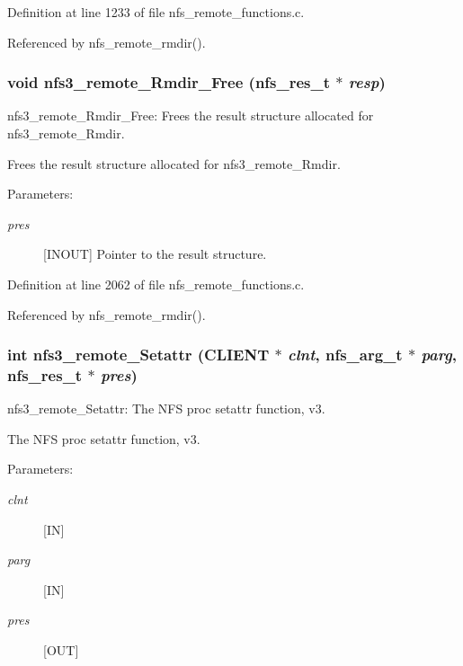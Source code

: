 Definition at line 1233 of file nfs\_\-remote\_\-functions.c.

Referenced by nfs\_\-remote\_\-rmdir().
\subsubsection{\setlength{\rightskip}{0pt plus 5cm}void nfs3\_\-remote\_\-Rmdir\_\-Free (nfs\_\-res\_\-t $\ast$ {\em resp})}\label{group__NFSprocs_ga84}


nfs3\_\-remote\_\-Rmdir\_\-Free: Frees the result structure allocated for nfs3\_\-remote\_\-Rmdir.

Frees the result structure allocated for nfs3\_\-remote\_\-Rmdir.

\begin{Desc}
\item[Parameters:]
\begin{description}
\item[{\em pres}][INOUT] Pointer to the result structure. \end{description}
\end{Desc}


Definition at line 2062 of file nfs\_\-remote\_\-functions.c.

Referenced by nfs\_\-remote\_\-rmdir().
\subsubsection{\setlength{\rightskip}{0pt plus 5cm}int nfs3\_\-remote\_\-Setattr (CLIENT $\ast$ {\em clnt}, nfs\_\-arg\_\-t $\ast$ {\em parg}, nfs\_\-res\_\-t $\ast$ {\em pres})}\label{group__NFSprocs_ga20}


nfs3\_\-remote\_\-Setattr: The NFS proc setattr function, v3.

The NFS proc setattr function, v3.

\begin{Desc}
\item[Parameters:]
\begin{description}
\item[{\em clnt}][IN] \item[{\em parg}][IN] \item[{\em pres}][OUT] \end{description}
\end{Desc}


